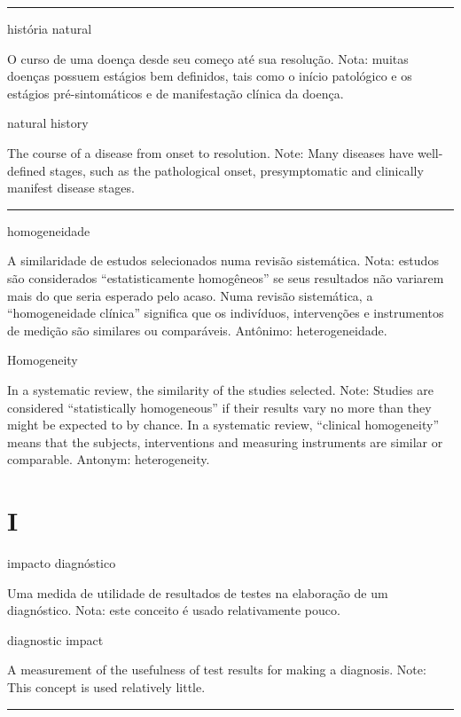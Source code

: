 \documentclass[
]{book}
\begin{document}
\begin{center}\rule{0.5\linewidth}{0.5pt}\end{center}

história natural

O curso de uma doença desde seu começo até sua resolução. Nota: muitas doenças possuem estágios bem definidos, tais como o início patológico e os estágios pré-sintomáticos e de manifestação clínica da doença.

natural history

The course of a disease from onset to resolution. Note: Many diseases have well-defined stages, such as the pathological onset, presymptomatic and clinically manifest disease stages.

\begin{center}\rule{0.5\linewidth}{0.5pt}\end{center}

homogeneidade

A similaridade de estudos selecionados numa revisão sistemática. Nota: estudos são considerados ``estatisticamente homogêneos'' se seus resultados não variarem mais do que seria esperado pelo acaso. Numa revisão sistemática, a ``homogeneidade clínica'' significa que os indivíduos, intervenções e instrumentos de medição são similares ou comparáveis. Antônimo: heterogeneidade.

Homogeneity

In a systematic review, the similarity of the studies selected. Note: Studies are considered ``statistically homogeneous'' if their results vary no more than they might be expected to by chance. In a systematic review, ``clinical homogeneity'' means that the subjects, interventions and measuring instruments are similar or comparable. Antonym: heterogeneity.

\hypertarget{i}{%
\chapter*{I}\label{i}}

impacto diagnóstico

Uma medida de utilidade de resultados de testes na elaboração de um diagnóstico. Nota: este conceito é usado relativamente pouco.

diagnostic impact

A measurement of the usefulness of test results for making a diagnosis. Note: This concept is used relatively little.

\begin{center}\rule{0.5\linewidth}{0.5pt}\end{center}
\end{document}
